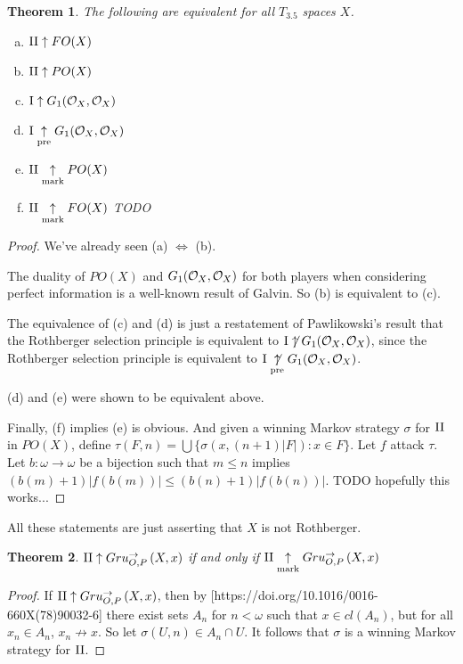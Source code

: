 \documentclass[11pt]{article}
\theoremstyle{plain}
\newtheorem{theorem}{Theorem}
\theoremstyle{definition}
\theoremstyle{remark}
\theoremstyle{plain}
\theoremstyle{definition}
\theoremstyle{remark}
\begin{document}
\begin{theorem}
The following are equivalent for all \(T_{3.5}\) spaces \(X\).
\begin{enumerate}[a)]
\item \(\mathrm{II}\uparrow FO(X)\)
\item \(\mathrm{II}\uparrow PO(X)\)
\item \(\mathrm{I}\uparrow G_1(\mathcal{O}_{X},\mathcal{O}_{X})\)
\item \(\mathrm{I}\underset{\text{pre}}{\uparrow} G_1(\mathcal{O}_{X},\mathcal{O}_{X})\)
\item \(\mathrm{II}\underset{\text{mark}}{\uparrow} PO(X)\)
\item \(\mathrm{II}\underset{\text{mark}}{\uparrow} FO(X)\) TODO
\end{enumerate}
\end{theorem}
\begin{proof}
We've already seen (a) \(\Leftrightarrow\) (b).

The duality of \(PO(X)\) and \(G_1(\mathcal{O}_{X},\mathcal{O}_{X})\) for both players
when considering perfect information is a well-known result of Galvin.
So (b) is equivalent to (c).

The equivalence of (c) and (d) is just a restatement of Pawlikowski's
result that the Rothberger selection principle is equivalent
to \(\mathrm{I}\not\uparrow G_1(\mathcal{O}_{X},\mathcal{O}_{X})\), since the Rothberger selection principle
is equivalent to \(\mathrm{I}\underset{\text{pre}}{\not\uparrow}G_1(\mathcal{O}_{X},\mathcal{O}_{X})\).

(d) and (e) were shown to be equivalent above.

Finally, (f) implies (e) is obvious. And given a winning Markov strategy
\(\sigma\) for \(\mathrm{II}\) in \(PO(X)\), define 
\(\tau(F,n)=\bigcup\{\sigma(x,(n+1)|F|):x\in F\}\). 
Let \(f\) attack \(\tau\). Let \(b:\omega\to\omega\) be a bijection
such that \(m\leq n\) implies \((b(m)+1)|f(b(m))|\leq(b(n)+1)|f(b(n))|\).
TODO hopefully this works...
\end{proof}

All these statements are just asserting that \(X\) is not Rothberger.

\begin{theorem}
\(\mathrm{II}\uparrow Gru_{O,P}^{\to}\left({X},{x}\right)\) if and only if
\(\mathrm{II}\underset{\text{mark}}{\uparrow}Gru_{O,P}^{\to}\left({X},{x}\right)\)
\end{theorem}
\begin{proof}
If \(\mathrm{II}\uparrow Gru_{O,P}^{\to}\left({X},{x}\right)\), then by
[https://doi.org/10.1016/0016-660X(78)90032-6]
there exist sets \(A_n\) for \(n<\omega\) such
that \(x\in cl(A_n)\), but for all \(x_n\in A_n\),
\(x_n\not\to x\). So let \(\sigma(U,n)\in A_n\cap U\).
It follows that \(\sigma\) is a winning Markov strategy
for \(\mathrm{II}\).
\end{proof}
\end{document}
